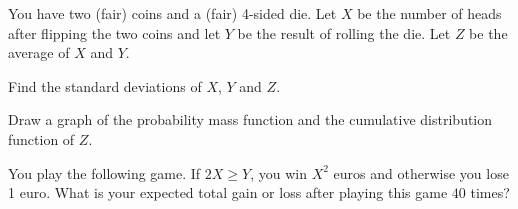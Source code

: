 \documentclass[a4paper,10pt,landscape,twocolumn]{scrartcl}
\begin{document}

\begin{exercise}
  You have two (fair) coins and a (fair) 4-sided die. Let $X$ be the number of
  heads after flipping the two coins and let $Y$ be the result of rolling the
  die. Let $Z$ be the average of $X$ and $Y$.

  \begin{subex}[1.5pt]
    Find the standard deviations of $X$, $Y$ and $Z$.	
  \end{subex}
  
  \begin{subex}[1pt]
    Draw a graph of the probability mass function and the cumulative
    distribution function of $Z$.
  \end{subex}
  
  \begin{subex}[1.5pt]
    You play the following game. If $2X \ge Y$, you win $X^2$ euros and
    otherwise you lose 1 euro. What is your expected total gain or loss after
    playing this game $40$ times?
  \end{subex}
\end{exercise}
\end{document}
